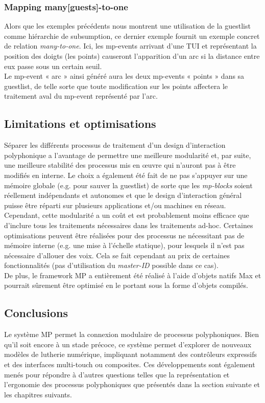 \subsubsection*{Mapping many[guests]-to-one}
\noindent Alors que les exemples précédents nous montrent une utilisation de la guestlist comme hiérarchie de subsumption, ce dernier exemple fournit un exemple concret de relation \textit{many-to-one}. Ici, les mp-events arrivant d'une \gls{TUI} et représentant la position des doigts (les points) causeront l'apparition d'un arc si la distance entre eux passe sous un certain seuil.\\
\indent Le mp-event « arc » ainsi généré aura les deux mp-events « points » dans sa guestlist, de telle sorte que toute modification sur les points affectera le traitement aval du mp-event représenté par l'arc.

\subsection{Limitations et optimisations}

\noindent Séparer les différents processus de traitement d'un design d'interaction polyphonique a l'avantage de permettre une meilleure modularité et, par suite, une meilleure stabilité des processus mis en œuvre qui n'auront pas à être modifiés en interne. Le choix a également été fait de ne pas s'appuyer sur une mémoire globale (e.g. pour sauver la guestlist) de sorte que les \textit{mp-blocks} soient réellement indépendants et autonomes et que le design d'interaction général puisse être réparti sur plusieurs applications et/ou machines en réseau.\\
\indent Cependant, cette modularité a un coût et est probablement moins efficace que d'inclure tous les traitements nécessaires dans les traitements ad-hoc. Certaines optimisations peuvent être réalisées pour des processus ne nécessitant pas de mémoire interne (e.g. une mise à l'échelle statique), pour lesquels il n'est pas nécessaire d'allouer des voix. Cela se fait cependant au prix de certaines fonctionnalités (pas d'utilisation du \textit{master-ID} possible dans ce cas).\\
\indent De plus, le framework MP a entièrement été réalisé à l'aide d'objets natifs Max et pourrait sûrement être optimisé en le portant sous la forme d'objets compilés.

\subsection{Conclusions}
\noindent Le système MP permet la connexion modulaire de processus polyphoniques. Bien qu'il soit encore à un stade précoce, ce système permet d'explorer de nouveaux modèles de lutherie numérique, impliquant notamment des contrôleurs expressifs et des interfaces multi-touch ou composites.
Ces développements sont également menés pour répondre à d'autres questions telles que la représentation et l'ergonomie des processus polyphoniques que présentés dans la section suivante et les chapitres suivants.

